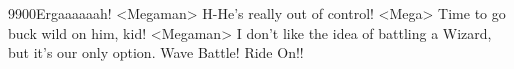 {99}{00}Ergaaaaaah! 
<Megaman> H-He's really out of control! 
<Mega> Time to go buck wild on him, kid! 
<Megaman> I don't like the idea of battling a Wizard, but it's our only option. 
Wave Battle! Ride On!! 
